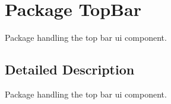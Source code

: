 \hypertarget{namespace_top_bar}{\section{Package Top\-Bar}
\label{namespace_top_bar}
}


Package handling the top bar ui component.  




\subsection{Detailed Description}
Package handling the top bar ui component. 